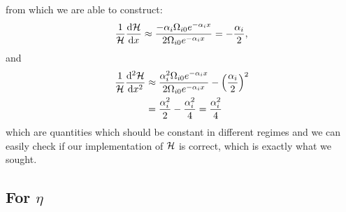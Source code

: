     from which we are able to construct:
    \begin{equation}
        \frac{1}{\mathcal{H}}\dv{\mathcal{H}}{x} \approx \frac{-\alpha_i\Omega_{i0}e^{-\alpha_ix}}{2\Omega_{i0}e^{-\alpha_ix}} = -\frac{\alpha_i}{2},
    \end{equation}
    and
    \begin{equation}
        \begin{split}
            \frac{1}{\mathcal{H}}\dv[2]{\mathcal{H}}{x} &\approx \frac{\alpha_i^2\Omega_{i0}e^{-\alpha_ix}}{2\Omega_{i0}e^{-\alpha_ix}} - \left(\frac{\alpha_i}{2}\right)^2 \\
            &= \frac{\alpha_i^2}{2} - \frac{\alpha_i^2}{4} = \frac{\alpha_i^2}{4}
        \end{split}
    \end{equation}
    which are quantities which should be constant in different regimes and we can easily check if our implementation of $\mathcal{H}$ is correct, which is exactly what we sought. 

\subsection{For $\eta$}

